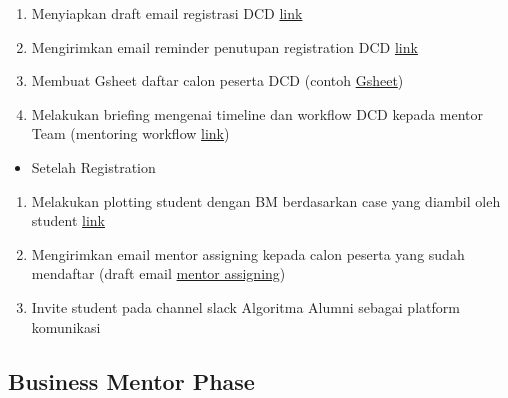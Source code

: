 \documentclass[
]{book}
\providecommand{\tightlist}{%
  \setlength{\itemsep}{0pt}\setlength{\parskip}{0pt}}
\begin{document}
\begin{enumerate}
\def\labelenumi{\arabic{enumi}.}
\tightlist
\item
  Menyiapkan draft email registrasi DCD \href{https://docs.google.com/document/d/1EDYH3DnzUElPApt2pIBEh9HJV5d7K0OmmsTOs5BmcKI/edit?usp=sharing}{link}
\item
  Mengirimkan email reminder penutupan registration DCD \href{https://docs.google.com/document/d/1EDYH3DnzUElPApt2pIBEh9HJV5d7K0OmmsTOs5BmcKI/edit\#heading=h.yhbqjuew20hg}{link}
\item
  Membuat Gsheet daftar calon peserta DCD (contoh \href{https://docs.google.com/spreadsheets/d/1P_dRfwtu_yTWtPr-RHKjIon_ZXVUdf2RtMXiWMqWrZk/edit?usp=sharing}{Gsheet})
\item
  Melakukan briefing mengenai timeline dan workflow DCD kepada mentor Team (mentoring workflow \href{https://docs.google.com/presentation/d/1iERQj08tN_PHhIKs2RA37kH6IsQ5FzV3uALNC3SsEsk/edit?usp=sharing}{link})
\end{enumerate}

\begin{itemize}
\tightlist
\item
  Setelah Registration
\end{itemize}

\begin{enumerate}
\def\labelenumi{\arabic{enumi}.}
\tightlist
\item
  Melakukan plotting student dengan BM berdasarkan case yang diambil oleh student \href{https://docs.google.com/spreadsheets/d/1P_dRfwtu_yTWtPr-RHKjIon_ZXVUdf2RtMXiWMqWrZk/edit\#gid=1325523908}{link}
\item
  Mengirimkan email mentor assigning kepada calon peserta yang sudah mendaftar (draft email \href{https://docs.google.com/document/d/1EDYH3DnzUElPApt2pIBEh9HJV5d7K0OmmsTOs5BmcKI/edit\#heading=h.bwo0f6c325u7}{mentor assigning})
\item
  Invite student pada channel slack Algoritma Alumni sebagai platform komunikasi
\end{enumerate}

\hypertarget{business-mentor-phase}{%
\subsection{Business Mentor Phase}\label{business-mentor-phase}}
\end{document}
